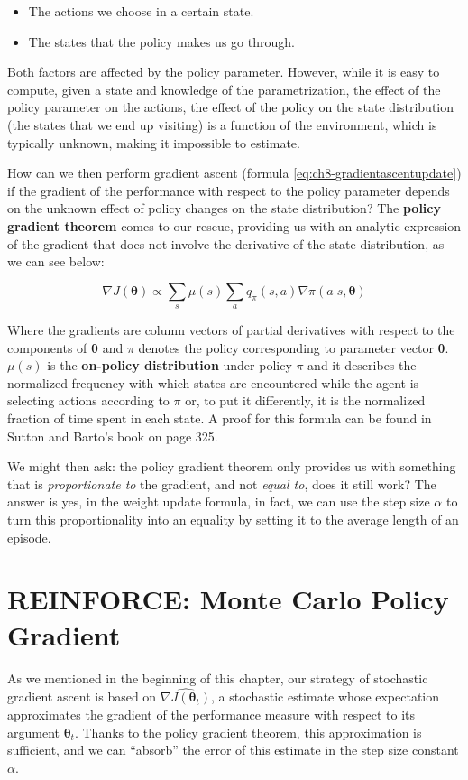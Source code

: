 \begin{itemize}
    \item The actions we choose in a certain state.
    \item The states that the policy makes us go through.
\end{itemize}

Both factors are affected by the policy parameter. However, while it is easy to compute, given a state and knowledge of the parametrization, the effect of the policy parameter on the actions, the effect of the policy on the state distribution (the states that we end up visiting) is a function of the environment, which is typically unknown, making it impossible to estimate. 

How can we then perform gradient ascent (formula \ref{eq:ch8-gradientascentupdate}) if the gradient of the performance with respect to the policy parameter depends on the unknown effect of policy changes on the state distribution?  The \textbf{policy gradient theorem} comes to our rescue, providing us with an analytic expression of the gradient that does not involve the derivative of the state distribution, as we can see below:

\begin{equation}
    \nabla J(\boldsymbol{\theta}) \propto \sum_s \mu(s) \sum_a q_\pi(s,a) \nabla\pi(a \vert s, \boldsymbol{\theta})
    \label{eq:ch8-policygradienttheorem}
\end{equation}

Where the gradients are column vectors of partial derivatives with respect to the components of $\boldsymbol{\theta}$ and $\pi$ denotes the policy corresponding to parameter vector $\boldsymbol{\theta}$. $\mu(s)$ is the \textbf{on-policy distribution} under policy $\pi$ and it describes the normalized frequency with which states are encountered while the agent is selecting actions according to $\pi$ or, to put it differently, it is the normalized fraction of time spent in each state. A proof for this formula can be found in Sutton and Barto’s book on page 325.

We might then ask: the policy gradient theorem only provides us with something that is \textit{proportionate to} the gradient, and not \textit{equal to}, does it still work? The answer is yes, in the weight update formula, in fact, we can use the step size $\alpha$ to turn this proportionality into an equality by setting it to the average length of an episode.

\section{REINFORCE: Monte Carlo Policy Gradient}
As we mentioned in the beginning of this chapter, our strategy of stochastic gradient ascent is based on $\widehat{\nabla J(\boldsymbol{\theta}_t)}$, a stochastic estimate whose expectation approximates the gradient of the performance measure with respect to its argument $\boldsymbol{\theta}_t$. Thanks to the policy gradient theorem, this approximation is sufficient, and we can ``absorb'' the error of this estimate in the step size constant $\alpha$. 

